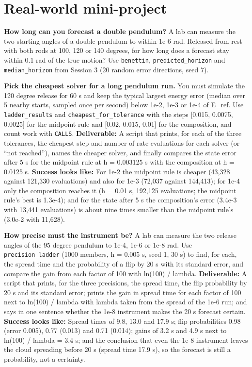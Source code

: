 \documentclass[11pt,a4paper]{article}
\begin{document}
\section{Real-world mini-project}
\textbf{How long can you forecast a double pendulum?} A lab can measure the two starting angles of a double pendulum to within 1e-6 rad. Released from rest with both rods at 100, 120 or 140 degrees, for how long does a forecast stay within 0.1 rad of the true motion? Use \texttt{benettin}, \texttt{predicted\_horizon} and \texttt{median\_horizon} from Session 3 (20 random error directions, seed 7).

\textbf{Pick the cheapest solver for a long pendulum run.} You must simulate the 120 degree release for 60 s and keep the typical largest energy error (median over 5 nearby starts, sampled once per second) below 1e-2, 1e-3 or 1e-4 of E\_ref. Use \texttt{ladder\_results} and \texttt{cheapest\_for\_tolerance} with the steps [0.015, 0.0075, 0.0025] for the midpoint rule and [0.02, 0.015, 0.01] for the composition, and count work with \texttt{CALLS}. \textbf{Deliverable:} A script that prints, for each of the three tolerances, the cheapest step and number of rate evaluations for each solver (or ``not reached''), names the cheaper solver, and finally compares the state error after 5 s for the midpoint rule at h = 0.003125 s with the composition at h = 0.0125 s. \textbf{Success looks like:} For 1e-2 the midpoint rule is cheaper (43,328 against 121,330 evaluations) and also for 1e-3 (72,037 against 144,413); for 1e-4 only the composition reaches it (h = 0.01 s, 192,125 evaluations; the midpoint rule's best is 1.3e-4); and for the state after 5 s the composition's error (3.4e-3 with 13,441 evaluations) is about nine times smaller than the midpoint rule's (3.0e-2 with 11,628).

\textbf{How precise must the instrument be?} A lab can measure the two release angles of the 95 degree pendulum to 1e-4, 1e-6 or 1e-8 rad. Use \texttt{precision\_ladder} (1000 members, h = 0.005 s, seed 1, 30 s) to find, for each, the spread time and the probability of a flip by 20 s with its standard error, and compare the gain from each factor of 100 with ln(100) / lambda. \textbf{Deliverable:} A script that prints, for the three precisions, the spread time, the flip probability by 20 s and its standard error; prints the gain in spread time for each factor of 100 next to ln(100) / lambda with lambda taken from the spread of the 1e-6 run; and says in one sentence whether the 1e-8 instrument makes the 20 s forecast certain. \textbf{Success looks like:} Spread times of 9.8, 13.0 and 17.9 s; flip probabilities 0.98 (error 0.005), 0.77 (0.013) and 0.71 (0.014); gains of 3.2 s and 4.9 s next to ln(100) / lambda = 3.4 s; and the conclusion that even the 1e-8 instrument leaves the cloud spreading before 20 s (spread time 17.9 s), so the forecast is still a probability, not a certainty.
\end{document}
